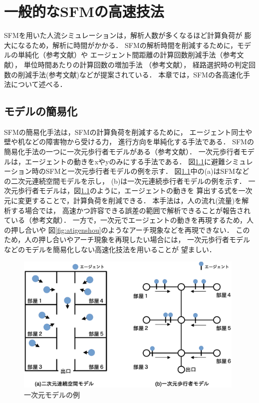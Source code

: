 \chapter{一般的なSFMの高速技法}
\label{sec:survey}
SFMを用いた人流シミュレーションは，解析人数が多くなるほど計算負荷が
膨大になるため，解析に時間がかかる．
SFMの解析時間を削減するために，モデルの単純化（参考文献）や
エージェント間距離の計算回数削減手法（参考文献），
単位時間あたりの計算回数の増加手法 （参考文献），
経路選択時の判定回数の削減手法(参考文献)などが提案されている．
本章では，SFMの各高速化手法について述べる．

\section{モデルの簡易化}
SFMの簡易化手法は，SFMの計算負荷を削減するために，
エージェント同士や壁や机などの障害物から受ける力，
進行方向を単純化する手法である．
SFMの簡易化手法の一つに一次元歩行者モデルがある（参考文献）．
一次元歩行者モデルは，エージェントの動きをxやyのみにする手法である．
図\ref{fig:ichijigen_ex}に避難シミュレーション時のSFMと一次元歩行者モデルの例を示す．
図\ref{fig:ichijigen_ex}中の(a)はSFMなどの二次元連続空間モデルを示し，
(b)は一次元連続歩行者モデルの例を示す．
一次元歩行者モデルは，図\ref{fig:ichijigen_ex}のように，エージェントの動きを
算出する式を一次元に変更することで，計算負荷を削減できる．
本手法は，人の流れ(流量)を解析する場合では，
高速かつ許容できる誤差の範囲で解析できることが報告されている（参考文献）．
一方で，一次元でエージェントの動きを再現するため，人の押し合いや
図\ref{fig:atigenshou}のようなアーチ現象などを再現できない．
このため，人の押し合いやアーチ現象を再現したい場合には，
一次元歩行者モデルなどのモデルを簡易化しない高速化技法を用いることが
望ましい．


\begin{figure}[hbtp]
 \begin{center}
  \includegraphics[width=11cm,clip]{figure/ichijigen_ex.eps}
  \caption{一次元モデルの例}
  \label{fig:ichijigen_ex}
 \end{center}
\end{figure}

